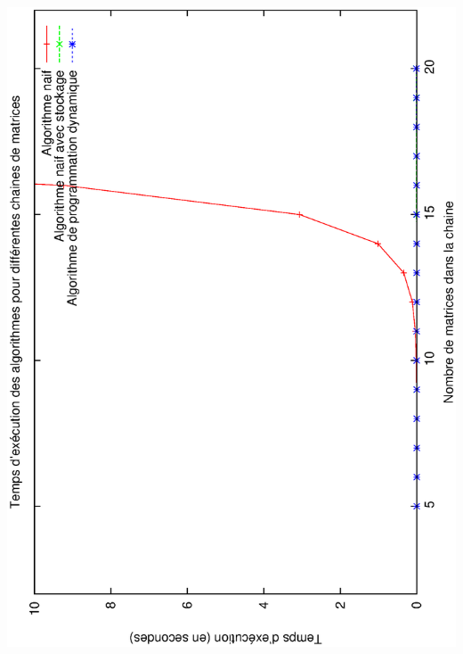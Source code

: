 \documentclass[10.9pt]{article} %
\begin{document}
\begin{center}
 \includegraphics[angle=270,scale=0.5]{resultat.eps}

\end{center}
\end{document}
